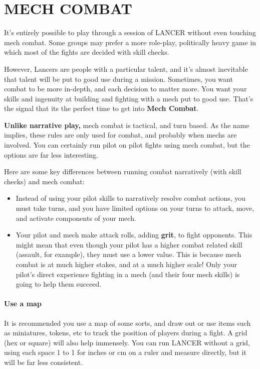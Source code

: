 \chapter{MECH COMBAT}
It’s entirely possible to play through a session of LANCER without even touching mech combat. Some groups may prefer a more role-play, politically heavy game in which most of the fights are decided with skill checks.

However, Lancers are people with a particular talent, and it’s almost inevitable that talent will be put to good use during a mission. Sometimes, you want combat to be more in-depth, and each decision to matter more. You want your skills and ingenuity at building and fighting with a mech put to good use. That’s the signal that its the perfect time to get into \textbf{Mech Combat}.

\textbf{Unlike narrative play,} mech combat is tactical, and turn based. As the name implies, these rules are only used for combat, and probably when mechs are involved. You can certainly run pilot on pilot fights using mech combat, but the options are far less interesting. 

Here are some key differences between running combat narratively (with skill checks) and mech combat:
\renewcommand{\labelitemi}{\(-\)}
\begin{itemize}
    \item Instead of using your pilot skills to narratively resolve combat actions, you must take turns, and you have limited options on your turns to attack, move, and activate components of your mech.
    \item Your pilot and mech make attack rolls, adding \textbf{grit}, to fight opponents. This might mean that even though your pilot has a higher combat related skill (assault, for example), they must use a lower value. This is because mech combat is at much higher stakes, and at a much higher scale! Only your pilot’s direct experience fighting in a mech (and their four mech skills) is going to help them succeed.
\end{itemize}

\subsubsection{Use a map}

It is recommended you use a map of some sorts, and draw out or use items such as miniatures, tokens, etc to track the position of players during a fight. A grid (hex or square) will also help immensely. You can run LANCER without a grid, using each space 1 to 1 for inches or cm on a ruler and measure directly, but it will be far less consistent.

